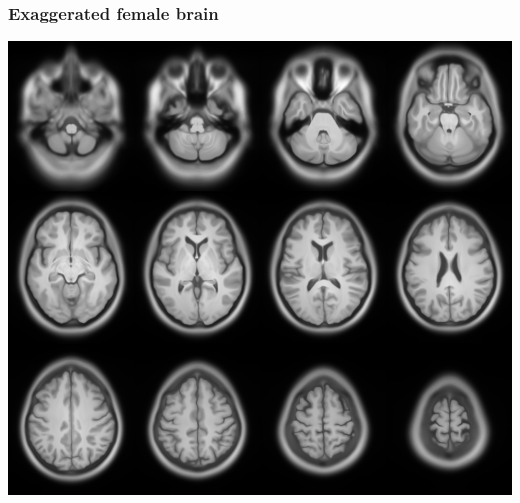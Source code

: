 \begin{frame}
\frametitle{Exaggerated female brain}
\begin{center}
\includegraphics[width=.7\textwidth]{hyper_female}
\end{center}
\end{frame}

